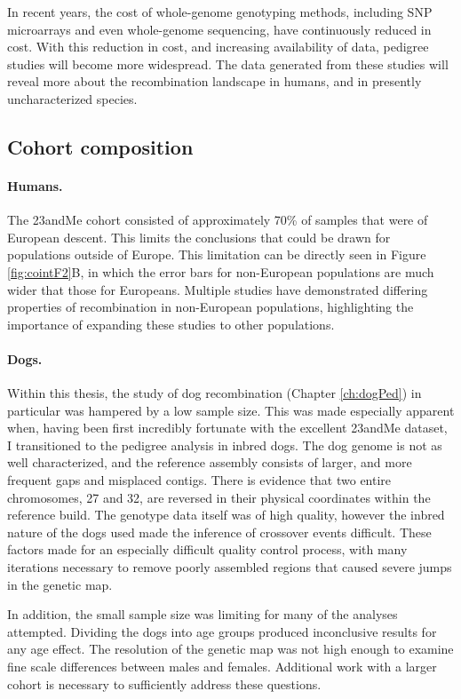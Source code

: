 In recent years, the cost of whole-genome genotyping methods, including SNP microarrays and even whole-genome sequencing, have continuously reduced in cost.
With this reduction in cost, and increasing availability of data, pedigree studies will become more widespread.
The data generated from these studies will reveal more about the recombination landscape in humans, and in presently uncharacterized species.

\subsection{Cohort composition}
\paragraph{Humans.}
The 23andMe cohort consisted of approximately 70\% of samples that were of European descent.
This limits the conclusions that could be drawn for populations outside of Europe.
This limitation can be directly seen in Figure \ref{fig:cointF2}B, in which the error bars for non-European populations are much wider that those for Europeans.
Multiple studies have demonstrated differing properties of recombination in non-European populations\cite{Bleazard2013,Hinch2011,Berg2011}, highlighting the importance of expanding these studies to other populations.

\paragraph{Dogs.}
Within this thesis, the study of dog recombination (Chapter \ref{ch:dogPed}) in particular was hampered by a low sample size.
This was made especially apparent when, having been first incredibly fortunate with the excellent 23andMe dataset, I transitioned to the pedigree analysis in inbred dogs.
The dog genome is not as well characterized, and the reference assembly consists of larger, and more frequent gaps and misplaced contigs.
There is evidence that two entire chromosomes, 27 and 32, are reversed in their physical coordinates within the reference build\cite{Wong2010}.
The genotype data itself was of high quality, however the inbred nature of the dogs used made the inference of crossover events difficult.
These factors made for an especially difficult quality control process, with many iterations necessary to remove poorly assembled regions that caused severe jumps in the genetic map.

In addition, the small sample size was limiting for many of the analyses attempted.
Dividing the dogs into age groups produced inconclusive results for any age effect.
The resolution of the genetic map was not high enough to examine fine scale differences between males and females.
Additional work with a larger cohort is necessary to sufficiently address these questions.




